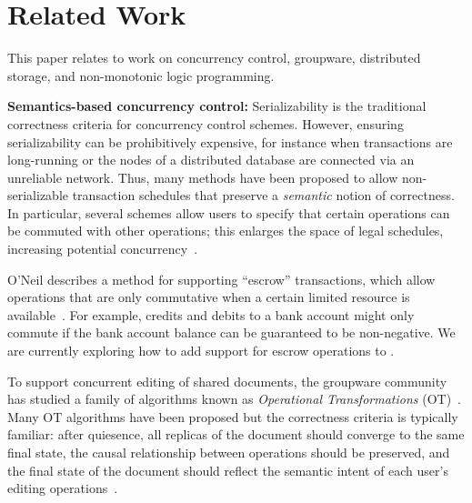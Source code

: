 \section{Related Work}
\label{sec:relwork}

This paper relates to work on concurrency control, groupware, distributed
storage, and non-monotonic logic programming.

\vspace{0.5em}\noindent
\textbf{Semantics-based concurrency control:} Serializability is the traditional
correctness criteria for concurrency control schemes. However, ensuring
serializability can be prohibitively expensive, for instance when transactions
are long-running or the nodes of a distributed database are connected via an
unreliable network. Thus, many methods have been proposed to allow
non-serializable transaction schedules that preserve a \emph{semantic} notion
of correctness. In particular, several schemes allow users to specify that
certain operations can be commuted with other operations; this enlarges the
space of legal schedules, increasing potential
concurrency~\cite{Farrag1989,Garcia-Molina1983,Weihl1988}.


O'Neil describes a method for supporting ``escrow'' transactions, which allow
operations that are only commutative when a certain limited resource is
available~\cite{O'Neil1986}. For example, credits and debits to a bank account
might only commute if the bank account balance can be guaranteed to be
non-negative. We are currently exploring how to add support for escrow
operations to \lang.

To support concurrent editing of shared documents, the groupware community has
studied a family of algorithms known as \emph{Operational Transformations}
(OT)~\cite{Ellis1989,Sun1998}. Many OT algorithms have been proposed but the
correctness criteria is typically familiar: after quiesence, all replicas of the
document should converge to the same final state, the causal relationship
between operations should be preserved, and the final state of the document
should reflect the semantic intent of each user's editing
operations~\cite{Sun1998a}.


